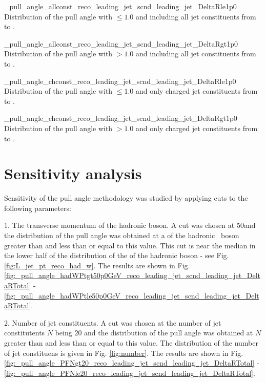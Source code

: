           {_pull_angle_allconst_reco_leading_jet_scnd_leading_jet_DeltaRle1p0}
          {Distribution of the pull angle with \DeltaR$\leq1.0$ and including all jet constituents from \leadingjet to \scndleadingjet.}

          {_pull_angle_allconst_reco_leading_jet_scnd_leading_jet_DeltaRgt1p0}
          {Distribution of the pull angle with \DeltaR$>1.0$ and including all jet constituents from \leadingjet to \scndleadingjet.}

          {_pull_angle_chconst_reco_leading_jet_scnd_leading_jet_DeltaRle1p0}
          {Distribution of the pull angle with \DeltaR$\leq1.0$ and only charged jet constituents from \leadingjet to \scndleadingjet.}

          {_pull_angle_chconst_reco_leading_jet_scnd_leading_jet_DeltaRgt1p0}
          {Distribution of the pull angle with \DeltaR$>1.0$ and only charged jet constituents from \leadingjet to \scndleadingjet.}


\section{Sensitivity analysis}

Sensitivity of the pull angle methodology was studied by applying cuts to the following parameters:

1. The transverse momentum \pt of the hadronic \PW boson. A cut was chosen at 50\GeV and the distribution of the pull angle was obtained at a \pt of the hadronic \PW\ boson greater than and less than or equal to this value. This cut is near the median in the lower half of the distribution of the \pt of the hadronic \PW boson - see Fig. \ref{fig:L_jet_pt_reco_had_w}. The results are shown in Fig. \ref{fig:_pull_angle_hadWPtgt50p0GeV_reco_leading_jet_scnd_leading_jet_DeltaRTotal} - \ref{fig:_pull_angle_hadWPtle50p0GeV_reco_leading_jet_scnd_leading_jet_DeltaRTotal}.

2. Number of jet constituents. A cut was chosen at the number of jet constitutents $N$ being 20 and the distribution of the pull angle was obtained at $N$ greater than and less than or equal to this value. The distribution of the number of jet constituens is given in Fig. \ref{fig:number}. The results are shown in Fig. \ref{fig:_pull_angle_PFNgt20_reco_leading_jet_scnd_leading_jet_DeltaRTotal} - \ref{fig:_pull_angle_PFNle20_reco_leading_jet_scnd_leading_jet_DeltaRTotal}.
                                        
